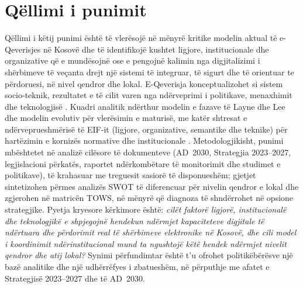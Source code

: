 \documentclass[conference]{IEEEtran}
\begin{document}
\section{Qëllimi i punimit}
\label{sec:qellimi}
Qëllimi i këtij punimi është të vlerësojë në mënyrë kritike modelin aktual
të e-Qeverisjes në Kosovë dhe të identifikojë kushtet ligjore,
institucionale dhe organizative që e mundësojnë ose e pengojnë kalimin nga
digjitalizimi i shërbimeve të veçanta drejt një sistemi të integruar, të
sigurt dhe të orientuar te përdoruesi, në nivel qendror dhe lokal.
E-Qeverisja konceptualizohet si sistem socio-teknik, rezultatet e të cilit
varen nga ndërveprimi i politikave, menaxhimit dhe teknologjisë
\cite{pardo2012}. Kuadri analitik ndërthur modelin e fazave të
Layne dhe Lee \cite{layne2001} dhe modelin evolutiv për vlerësimin e maturisë, me katër shtresat e
ndërveprueshmërisë të EIF-it (ligjore, organizative, semantike dhe teknike)
për hartëzimin e kornizës normative dhe institucionale \cite{eif2017}.
Metodologjikisht, punimi mbështetet në analizë cilësore të dokumenteve
(AD~2030, Strategjia 2023--2027, legjislacioni përkatës, raportet
ndërkombëtare të monitorimit dhe studimet e politikave), të krahasuar me
treguesit sasiorë të disponueshëm; gjetjet sintetizohen përmes analizës SWOT
të diferencuar për nivelin qendror e lokal dhe zgjerohen në matricën TOWS,
në mënyrë që diagnoza të shndërrohet në opsione strategjike. Pyetja kryesore
kërkimore është: \textit{cilët faktorë ligjorë, institucionalë dhe
teknologjikë e shpjegojnë hendekun ndërmjet kapaciteteve digjitale të
ndërtuara dhe përdorimit real të shërbimeve elektronike në Kosovë, dhe cili
model i koordinimit ndërinstitucional mund ta ngushtojë këtë hendek ndërmjet
nivelit qendror dhe atij lokal?} Synimi përfundimtar është t'u ofrohet
politikëbërësve një bazë analitike dhe një udhërrëfyes i zbatueshëm, në
përputhje me afatet e Strategjisë 2023--2027 dhe të AD~2030.
\end{document}
